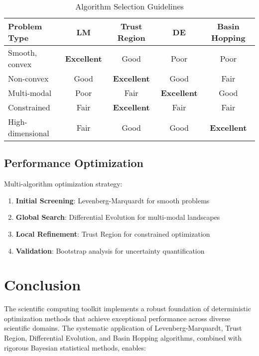 \documentclass[11pt,a4paper]{article}
\begin{document}
\begin{table}[H]
\centering
\caption{Algorithm Selection Guidelines}
\label{tab:algorithm_selection}
\begin{tabular}{@{}lcccc@{}}
\toprule
Problem Type & LM & Trust Region & DE & Basin Hopping \\
\midrule
Smooth, convex & \textcolor{algorithmcolor}{\textbf{Excellent}} & Good & Poor & Poor \\
Non-convex & Good & \textcolor{algorithmcolor}{\textbf{Excellent}} & Good & Fair \\
Multi-modal & Poor & Fair & \textcolor{algorithmcolor}{\textbf{Excellent}} & Good \\
Constrained & Fair & \textcolor{algorithmcolor}{\textbf{Excellent}} & Fair & Fair \\
High-dimensional & Fair & Good & Good & \textcolor{algorithmcolor}{\textbf{Excellent}} \\
\bottomrule
\end{tabular}
\end{table}

\subsection{Performance Optimization}
\label{subsec:performance_optimization}

Multi-algorithm optimization strategy:

\begin{enumerate}
    \item \textbf{Initial Screening}: Levenberg-Marquardt for smooth problems
    \item \textbf{Global Search}: Differential Evolution for multi-modal landscapes
    \item \textbf{Local Refinement}: Trust Region for constrained optimization
    \item \textbf{Validation}: Bootstrap analysis for uncertainty quantification
\end{enumerate}

\section{Conclusion}
\label{sec:conclusion}

The scientific computing toolkit implements a robust foundation of deterministic optimization methods that achieve exceptional performance across diverse scientific domains. The systematic application of Levenberg-Marquardt, Trust Region, Differential Evolution, and Basin Hopping algorithms, combined with rigorous Bayesian statistical methods, enables:
\end{document}
